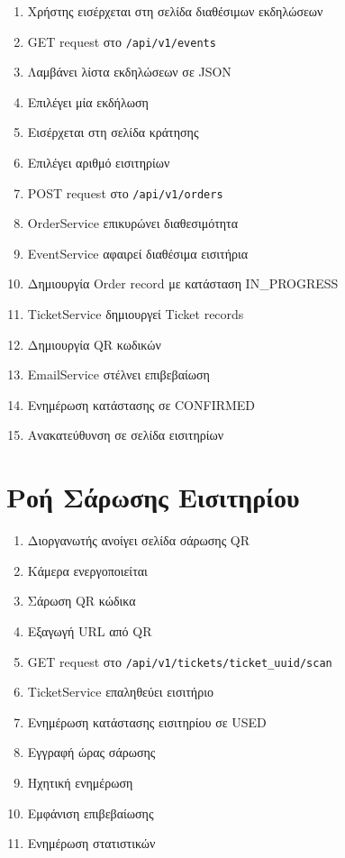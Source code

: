 \documentclass[12pt,a4paper]{report}
\begin{document}
\begin{enumerate}
    \item Χρήστης εισέρχεται στη σελίδα διαθέσιμων εκδηλώσεων
    \item GET request στο \texttt{/api/v1/events}
    \item Λαμβάνει λίστα εκδηλώσεων σε JSON
    \item Επιλέγει μία εκδήλωση
    \item Εισέρχεται στη σελίδα κράτησης
    \item Επιλέγει αριθμό εισιτηρίων
    \item POST request στο \texttt{/api/v1/orders}
    \item OrderService επικυρώνει διαθεσιμότητα
    \item EventService αφαιρεί διαθέσιμα εισιτήρια
    \item Δημιουργία Order record με κατάσταση IN\_PROGRESS
    \item TicketService δημιουργεί Ticket records
    \item Δημιουργία QR κωδικών
    \item EmailService στέλνει επιβεβαίωση
    \item Ενημέρωση κατάστασης σε CONFIRMED
    \item Ανακατεύθυνση σε σελίδα εισιτηρίων
\end{enumerate}

\section{Ροή Σάρωσης Εισιτηρίου}

\begin{enumerate}
    \item Διοργανωτής ανοίγει σελίδα σάρωσης QR
    \item Κάμερα ενεργοποιείται
    \item Σάρωση QR κώδικα
    \item Εξαγωγή URL από QR
    \item GET request στο \texttt{/api/v1/tickets/{ticket\_uuid}/scan}
    \item TicketService επαληθεύει εισιτήριο
    \item Ενημέρωση κατάστασης εισιτηρίου σε USED
    \item Εγγραφή ώρας σάρωσης
    \item Ηχητική ενημέρωση
    \item Εμφάνιση επιβεβαίωσης
    \item Ενημέρωση στατιστικών
\end{enumerate}
\end{document}
